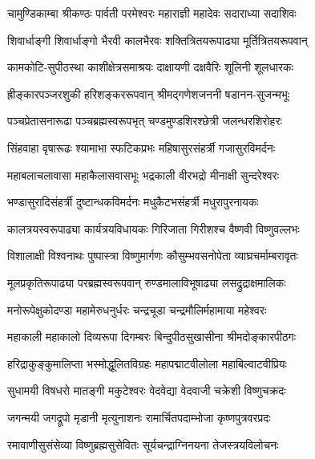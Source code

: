 


\twolineshloka
{चामुण्डिकाम्बा श्रीकण्ठः पार्वती परमेश्वरः}
{महाराज्ञी महादेवः सदाराध्या सदाशिवः}%

\twolineshloka
{शिवार्धाङ्गी शिवार्धाङ्गो भैरवी कालभैरवः}
{शक्तित्रितयरूपाढ्या मूर्तित्रितयरूपवान्}%

\twolineshloka
{कामकोटि-सुपीठस्था काशीक्षेत्रसमाश्रयः}
{दाक्षायणी दक्षवैरिः शूलिनी शूलधारकः}%

\twolineshloka
{ह्रीङ्कारपञ्जरशुकी हरिशङ्कररूपवान्}
{श्रीमद्गणेशजननी षडानन-सुजन्मभूः}%

\twolineshloka
{पञ्चप्रेतासनारूढा पञ्चब्रह्मस्वरूपभृत्}
{चण्डमुण्डशिरश्छेत्री जलन्धरशिरोहरः}%

\twolineshloka
{सिंहवाहा वृषारूढः  श्यामाभा स्फटिकप्रभः}
{महिषासुरसंहर्त्री गजासुरविमर्दनः}%

\twolineshloka
{महाबलाचलावासा महाकैलासवासभूः}
{भद्रकाली वीरभद्रो मीनाक्षी सुन्दरेश्वरः}%

\twolineshloka
{भण्डासुरादिसंहर्त्री दुष्टान्धकविमर्दनः}
{मधुकैटभसंहर्त्री मधुरापुरनायकः}%

\twolineshloka
{कालत्रयस्वरूपाढ्या कार्यत्रयविधायकः}
{गिरिजाता गिरीशश्च वैष्णवी विष्णुवल्लभः}%

\twolineshloka
{विशालाक्षी विश्वनाथः पुष्पास्त्रा विष्णुमार्गणः}
{कौसुम्भवसनोपेता व्याघ्रचर्माम्बरावृतः}%

\twolineshloka
{मूलप्रकृतिरूपाढ्या परब्रह्मस्वरूपवान्}
{रुण्डमालाविभूषाढ्या लसद्रुद्राक्षमालिकः}%

\twolineshloka
{मनोरूपेक्षुकोदण्डा महामेरुधनुर्धरः}
{चन्द्रचूडा चन्द्रमौलिर्महामाया महेश्वरः}%

\twolineshloka
{महाकाली महाकालो दिव्यरूपा दिगम्बरः}
{बिन्दुपीठसुखासीना श्रीमदोङ्कारपीठगः}%

\twolineshloka
{हरिद्राकुङ्कुमालिप्ता भस्मोद्धूलितविग्रहः}
{महापद्माटवीलोला महाबिल्वाटवीप्रियः}%

\twolineshloka
{सुधामयी विषधरो मातङ्गी मकुटेश्वरः}
{वेदवेद्या वेदवाजी चक्रेशी विष्णुचक्रदः}%

\twolineshloka
{जगन्मयी जगद्रूपो मृडानी मृत्युनाशनः}
{रामार्चितपदाम्भोजा कृष्णपुत्रवरप्रदः}%

\twolineshloka
{रमावाणीसुसंसेव्या विष्णुब्रह्मसुसेवितः}
{सूर्यचन्द्राग्निनयना तेजस्त्रयविलोचनः}%

